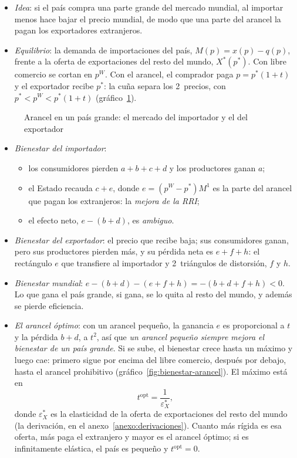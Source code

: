 \documentclass[11pt]{article}
\begin{document}
\begin{itemize}
\item \emph{Idea}: si el país compra una parte grande del mercado mundial, al importar menos hace bajar el precio mundial, de modo que una parte del arancel la pagan los exportadores extranjeros.
\item \emph{Equilibrio}: la demanda de importaciones del país, $M(p)=x(p)-q(p)$, frente a la oferta de exportaciones del resto del mundo, $X^*(p^*)$. Con libre comercio se cortan en $p^W$. Con el arancel, el comprador paga $p=p^*(1+t)$ y el exportador recibe $p^*$: la cuña separa los 2~precios, con $p^*<p^W<p^*(1+t)$ (gráfico~\ref{fig:arancel-grande}).
\end{itemize}
\begin{figure}[H]
\centering
\caption{Arancel en un país grande: el mercado del importador y el del exportador}\label{fig:arancel-grande}
\end{figure}
\begin{itemize}
\item \emph{Bienestar del importador}:
  \begin{itemize}
  \item los consumidores pierden $a+b+c+d$ y los productores ganan $a$;
  \item el Estado recauda $c+e$, donde $e=(p^W-p^*)M^1$ es la parte del arancel que pagan los extranjeros: la \emph{mejora de la RRI};
  \item el efecto neto, $e-(b+d)$, es \emph{ambiguo}.
  \end{itemize}
\item \emph{Bienestar del exportador}: el precio que recibe baja; sus consumidores ganan, pero sus productores pierden más, y su pérdida neta es $e+f+h$: el rectángulo $e$ que transfiere al importador y 2~triángulos de distorsión, $f$ y $h$.
\item \emph{Bienestar mundial}: $e-(b+d)-(e+f+h)=-(b+d+f+h)<0$. Lo que gana el país grande, si gana, se lo quita al resto del mundo, y además se pierde eficiencia.
\item \emph{El arancel óptimo}: con un arancel pequeño, la ganancia $e$ es proporcional a $t$ y la pérdida $b+d$, a $t^2$, así que \emph{un arancel pequeño siempre mejora el bienestar de un país grande}. Si se sube, el bienestar crece hasta un máximo y luego cae: primero sigue por encima del libre comercio, después por debajo, hasta el arancel prohibitivo (gráfico~\ref{fig:bienestar-arancel}). El máximo está en
  \begin{equation}\label{eq:arancel-optimo-parcial}
  t^{\mathrm{opt}}=\frac{1}{\varepsilon^*_X},
  \end{equation}
  donde $\varepsilon^*_X$ es la elasticidad de la oferta de exportaciones del resto del mundo (la derivación, en el anexo~\ref{anexo:derivaciones}). Cuanto más rígida es esa oferta, más paga el extranjero y mayor es el arancel óptimo; si es infinitamente elástica, el país es pequeño y $t^{\mathrm{opt}}=0$.
\end{itemize}
\end{document}
